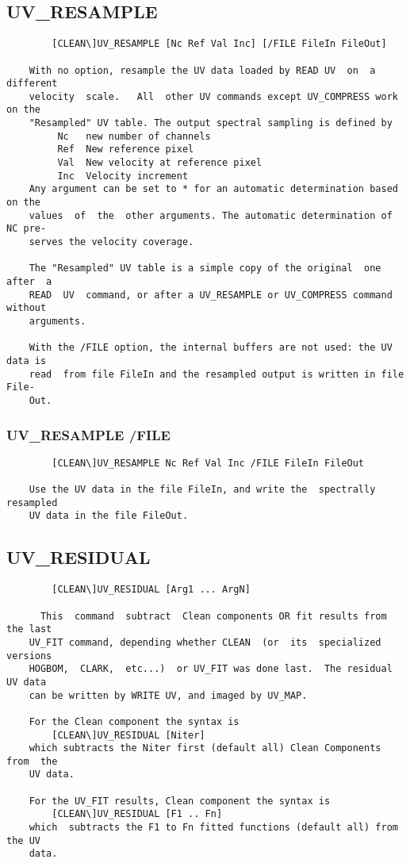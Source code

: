 \subsection{UV\_RESAMPLE}
\begin{verbatim}
        [CLEAN\]UV_RESAMPLE [Nc Ref Val Inc] [/FILE FileIn FileOut]

    With no option, resample the UV data loaded by READ UV  on  a  different
    velocity  scale.   All  other UV commands except UV_COMPRESS work on the
    "Resampled" UV table. The output spectral sampling is defined by
         Nc   new number of channels
         Ref  New reference pixel
         Val  New velocity at reference pixel
         Inc  Velocity increment
    Any argument can be set to * for an automatic determination based on the
    values  of  the  other arguments. The automatic determination of NC pre-
    serves the velocity coverage.

    The "Resampled" UV table is a simple copy of the original  one  after  a
    READ  UV  command, or after a UV_RESAMPLE or UV_COMPRESS command without
    arguments.

    With the /FILE option, the internal buffers are not used: the UV data is
    read  from file FileIn and the resampled output is written in file File-
    Out.

\end{verbatim}
\subsubsection{UV\_RESAMPLE /FILE}
\begin{verbatim}
        [CLEAN\]UV_RESAMPLE Nc Ref Val Inc /FILE FileIn FileOut

    Use the UV data in the file FileIn, and write the  spectrally  resampled
    UV data in the file FileOut.

\end{verbatim}
\subsection{UV\_RESIDUAL}
\begin{verbatim}
        [CLEAN\]UV_RESIDUAL [Arg1 ... ArgN]

      This  command  subtract  Clean components OR fit results from the last
    UV_FIT command, depending whether CLEAN  (or  its  specialized  versions
    HOGBOM,  CLARK,  etc...)  or UV_FIT was done last.  The residual UV data
    can be written by WRITE UV, and imaged by UV_MAP.

    For the Clean component the syntax is
        [CLEAN\]UV_RESIDUAL [Niter]
    which subtracts the Niter first (default all) Clean Components from  the
    UV data.

    For the UV_FIT results, Clean component the syntax is
        [CLEAN\]UV_RESIDUAL [F1 .. Fn]
    which  subtracts the F1 to Fn fitted functions (default all) from the UV
    data.

\end{verbatim}
